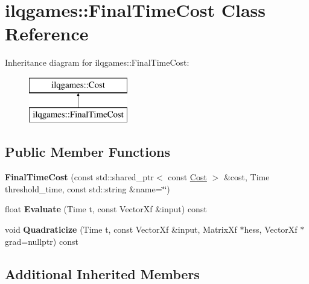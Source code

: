 \hypertarget{classilqgames_1_1_final_time_cost}{}\section{ilqgames\+:\+:Final\+Time\+Cost Class Reference}
\label{classilqgames_1_1_final_time_cost}
Inheritance diagram for ilqgames\+:\+:Final\+Time\+Cost\+:\begin{figure}[H]
\begin{center}
\leavevmode
\includegraphics[height=2.000000cm]{classilqgames_1_1_final_time_cost}
\end{center}
\end{figure}
\subsection*{Public Member Functions}
\begin{DoxyCompactItemize}
\item 
{\bfseries Final\+Time\+Cost} (const std\+::shared\+\_\+ptr$<$ const \hyperlink{classilqgames_1_1_cost}{Cost} $>$ \&cost, Time threshold\+\_\+time, const std\+::string \&name=\char`\"{}\char`\"{})\hypertarget{classilqgames_1_1_final_time_cost_a6990af0593d112126a7e327769bfff26}{}\label{classilqgames_1_1_final_time_cost_a6990af0593d112126a7e327769bfff26}

\item 
float {\bfseries Evaluate} (Time t, const Vector\+Xf \&input) const \hypertarget{classilqgames_1_1_final_time_cost_a69d2a9c213b4f25fbd653c6f62790523}{}\label{classilqgames_1_1_final_time_cost_a69d2a9c213b4f25fbd653c6f62790523}

\item 
void {\bfseries Quadraticize} (Time t, const Vector\+Xf \&input, Matrix\+Xf $\ast$hess, Vector\+Xf $\ast$grad=nullptr) const \hypertarget{classilqgames_1_1_final_time_cost_ac3b2789c4b5e38a357019bdeb8d7f390}{}\label{classilqgames_1_1_final_time_cost_ac3b2789c4b5e38a357019bdeb8d7f390}

\end{DoxyCompactItemize}
\subsection*{Additional Inherited Members}


